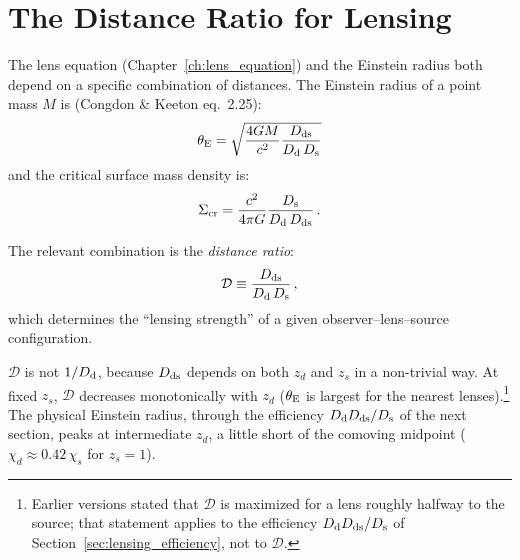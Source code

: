 \section{The Distance Ratio for Lensing}
\label{sec:distance_ratio}

The lens equation (Chapter~\ref{ch:lens_equation}) and the Einstein radius
both depend on a specific combination of distances.  The Einstein radius
of a point mass $M$ is (Congdon \& Keeton eq.~2.25):
\begin{equation}
    \theta_{\mathrm{E}} = \sqrt{\frac{4G M}{c^2}
    \frac{D_{\mathrm{ds}}}{D_{\mathrm{d}}\,D_{\mathrm{s}}}}
    \label{eq:einstein_radius_preview}
\end{equation}
and the critical surface mass density is:
\begin{equation}
    \Sigma_{\mathrm{cr}} = \frac{c^2}{4\pi G}
    \frac{D_{\mathrm{s}}}{D_{\mathrm{d}}\,D_{\mathrm{ds}}} \,.
    \label{eq:sigma_cr_preview}
\end{equation}

The relevant combination is the \emph{distance ratio}:
\begin{equation}
    \mathcal{D} \equiv \frac{D_{\mathrm{ds}}}{D_{\mathrm{d}}\,D_{\mathrm{s}}} \,,
    \label{eq:distance_ratio}
\end{equation}
which determines the ``lensing strength'' of a given observer--lens--source
configuration.

$\mathcal{D}$ is not $1/D_{\mathrm{d}}$, because $D_{\mathrm{ds}}$
depends on both $z_d$ and $z_s$ in a non-trivial way.  At fixed $z_s$,
$\mathcal{D}$ decreases monotonically with $z_d$ ($\theta_{\mathrm{E}}$ is largest for
the nearest lenses).\footnote{Earlier versions stated that $\mathcal{D}$ is
maximized for a lens roughly halfway to the source; that statement applies to
the efficiency $D_{\mathrm{d}}D_{\mathrm{ds}}/D_{\mathrm{s}}$ of Section~\ref{sec:lensing_efficiency}, not to
$\mathcal{D}$.}  The physical Einstein radius, through the efficiency
$D_{\mathrm{d}}D_{\mathrm{ds}}/D_{\mathrm{s}}$ of the next section, peaks at intermediate $z_d$, a little
short of the comoving midpoint ($\chi_d \approx 0.42\,\chi_s$ for $z_s = 1$).


